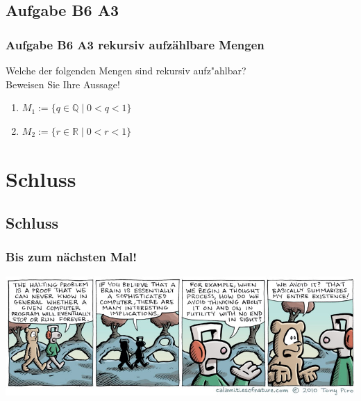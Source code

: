 \subsection{Aufgabe B6 A3}
\begin{frame}
	\frametitle{Aufgabe B6 A3 rekursiv aufzählbare Mengen}
	Welche der folgenden Mengen sind rekursiv aufz"ahlbar? \\
	Beweisen Sie Ihre Aussage!
	\begin{enumerate}
		\item $M_1 := \{q \in \mathbb{Q} \; | \; 0<q<1\}$
		\item $M_2 := \{r \in \mathbb{R} \; | \; 0<r<1\}$
	\end{enumerate}
\end{frame}

\section{Schluss}
\subsection{Schluss}
\begin{frame}
\frametitle{Bis zum nächsten Mal!}
\begin{center}
  \includegraphics[width=1.59 \textheight]{images/halting.jpg}
\end{center}
\end{frame}

